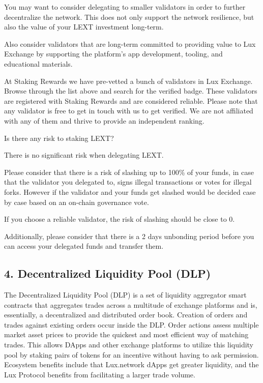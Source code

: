 \documentclass[11pt]{article}
\begin{document}
You may want to consider delegating to smaller validators in order to further decentralize the network. This does not only support the network resilience, but also the value of your LEXT investment long-term.


Also consider validators that are long-term committed to providing value to Lux Exchange by supporting the platform's app development, tooling, and educational materials.


At Staking Rewards we have pre-vetted a bunch of validators in Lux Exchange. Browse through the list above and search for the verified badge. These validators are registered with Staking Rewards and are considered reliable. Please note that any validator is free to get in touch with us to get verified. We are not affiliated with any of them and thrive to provide an independent ranking.


Is there any risk to staking LEXT?


There is no significant risk when delegating LEXT.


Please consider that there is a risk of slashing up to 100\% of your funds, in case that the validator you delegated to, signs illegal transactions or votes for illegal forks. However if the validator and your funds get slashed would be decided case by case based on an on-chain governance vote.


If you choose a reliable validator, the risk of slashing should be close to 0.


Additionally, please consider that there is a 2 days unbonding period before you can access your delegated funds and transfer them.


\subsection{4. Decentralized Liquidity Pool (DLP)}

The Decentralized Liquidity Pool (DLP) is a set of liquidity aggregator smart contracts that aggregates trades across a multitude of exchange platforms and is, essentially, a decentralized and distributed order book. Creation of orders and trades against existing orders occur inside the DLP. Order actions assess multiple market asset prices to provide the quickest and most efficient way of matching trades. This allows DApps and other exchange platforms to utilize this liquidity pool by staking pairs of tokens for an incentive without having to ask permission. Ecosystem benefits include that Lux.network dApps get greater liquidity, and the Lux Protocol benefits from facilitating a larger trade volume.
\end{document}
